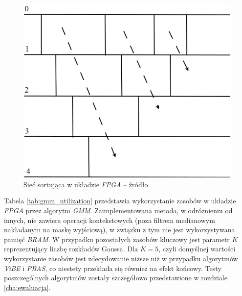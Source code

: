 	\begin{figure}[h!]
		\centering
		\includegraphics[scale=0.4]{img/4/sort_module.png}
		\caption{Sieć sortująca w układzie \textit{FPGA} -- źródło \cite{piszczek_15}}
		\label{fig:gmm_sort}
	\end{figure}	


Tabela \ref{tab:gmm_utilization} przedstawia wykorzystanie zasobów w układzie \textit{FPGA} przez algorytm \textit{GMM}. Zaimplementowana metoda, w odróżnieniu od innych, nie zawiera operacji kontekstowych (poza filtrem medianowym nakładanym na maskę wyjściową), w związku z tym nie jest wykorzystywana pamięć \textit{BRAM}. W przypadku pozostałych zasobów kluczowy jest parametr $K$ reprezentujący liczbę rozkładów Gaussa. Dla $K=5$, czyli domyślnej wartości wykorzystanie zasobów jest zdecydowanie niższe niż w przypadku algorytmów \textit{ViBE} i \textit{PBAS}, co niestety przekłada się również na efekt końcowy. Testy poszczególnych algorytmów zostały szczegółowo przedstawione w rozdziale \ref{cha:ewaluacja}.

